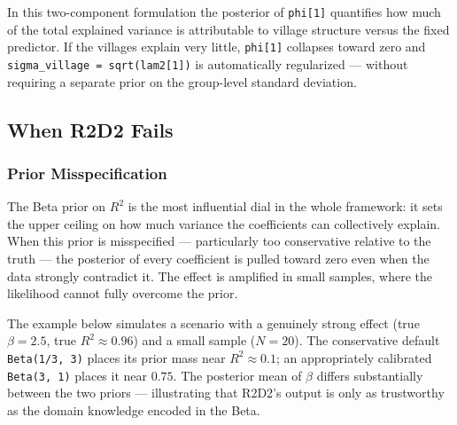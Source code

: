 \documentclass[
  letterpaper,
  DIV=11,
  numbers=noendperiod]{scrartcl}
\begin{document}
\begin{tcolorbox}[enhanced jigsaw, titlerule=0mm, arc=.35mm, leftrule=.75mm, colback=white, bottomtitle=1mm, toptitle=1mm, colbacktitle=quarto-callout-note-color!10!white, colframe=quarto-callout-note-color-frame, opacitybacktitle=0.6, bottomrule=.15mm, opacityback=0, toprule=.15mm, left=2mm, title=\textcolor{quarto-callout-note-color}{\faInfo}\hspace{0.5em}{Note}, rightrule=.15mm, breakable, coltitle=black]

In this two-component formulation the posterior of \texttt{phi{[}1{]}}
quantifies how much of the total explained variance is attributable to
village structure versus the fixed predictor. If the villages explain
very little, \texttt{phi{[}1{]}} collapses toward zero and
\texttt{sigma\_village\ =\ sqrt(lam2{[}1{]})} is automatically
regularized --- without requiring a separate prior on the group-level
standard deviation.

\end{tcolorbox}

\subsection{When R2D2 Fails}\label{when-r2d2-fails}

\subsubsection{Prior Misspecification}\label{prior-misspecification}

The Beta prior on \(R^2\) is the most influential dial in the whole
framework: it sets the upper ceiling on how much variance the
coefficients can collectively explain. When this prior is misspecified
--- particularly too conservative relative to the truth --- the
posterior of every coefficient is pulled toward zero even when the data
strongly contradict it. The effect is amplified in small samples, where
the likelihood cannot fully overcome the prior.

The example below simulates a scenario with a genuinely strong effect
(true \(\beta = 2.5\), true \(R^2 \approx 0.96\)) and a small sample
(\(N = 20\)). The conservative default \texttt{Beta(1/3,\ 3)} places its
prior mass near \(R^2 \approx 0.1\); an appropriately calibrated
\texttt{Beta(3,\ 1)} places it near \(0.75\). The posterior mean of
\(\beta\) differs substantially between the two priors --- illustrating
that R2D2's output is only as trustworthy as the domain knowledge
encoded in the Beta.
\end{document}
